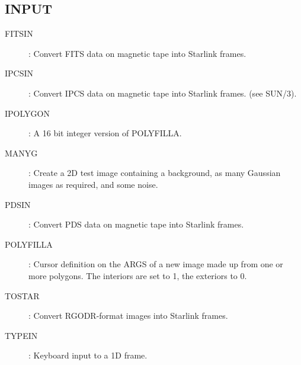 \subsection {INPUT}
\begin{description}
\item [FITSIN]: Convert FITS data on magnetic tape into Starlink frames.
\item [IPCSIN]: Convert IPCS data on magnetic tape into Starlink frames.
(see SUN/3).
\item [IPOLYGON]: A 16 bit integer version of POLYFILLA.
\item [MANYG]: Create a 2D test image containing a background, as many Gaussian
images as required, and some noise.
\item [PDSIN]: Convert PDS data on magnetic tape into Starlink frames.
\item [POLYFILLA]: Cursor definition on the ARGS of a new image made up from
one or more polygons.
The interiors are set to 1, the exteriors to 0.
\item [TOSTAR]: Convert RGODR-format images into Starlink frames.
\item [TYPEIN]: Keyboard input to a 1D frame.
\end{description}
